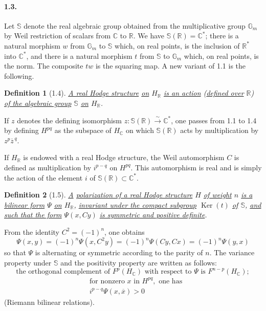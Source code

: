 \documentclass[10pt,leqno]{article}
\newcommand{\C}{\mathbb C}
\newcommand{\R}{\mathbb R}
\newcommand{\Gm}{\mathbb G_m}
\newcommand{\bS}{\mathbb S}
\newcommand{\Ker}{\operatorname{Ker}}
\theoremstyle{deligne}
\newtheorem*{definition}{Definition}
\renewcommand{\underline}[1]{\uline{#1}}
\begin{document}
\paragraph{1.3.}
Let $\bS$ denote the real algebraic group obtained from the multiplicative group $\Gm$ by Weil restriction of scalars from $\C$ to $\R$. We have $\bS(\R)=\C^*$; there is a natural morphism $w$ from $\Gm$ to $\bS$ which, on real points, is the inclusion of $\R^*$ into $\C^*$, and there is a natural morphism $t$ from $\bS$ to $\Gm$ which, on real points, is the norm. The composite $tw$ is the squaring map. A new variant of 1.1 is the following.

\begin{definition}[1.4]
\underline{A real Hodge structure} \underline{on} $H_\R$ \underline{is an action} (\underline{defined over} $\R$) \underline{of the algebraic group} $\bS$ \underline{on} $H_\R$.
\end{definition}

If $z$ denotes the defining isomorphism $z:\bS(\R)\xrightarrow{\sim}\C^*$, one passes from 1.1 to 1.4 by defining $H^{pq}$ as the subspace of $H_\C$ on which $\bS(\R)$ acts by multiplication by $z^p\overline z^{\,q}$.

If $H_\R$ is endowed with a real Hodge structure, the Weil automorphism $C$ is defined as multiplication by $i^{p-q}$ on $H^{pq}$. This automorphism is real and is simply the action of the element $i$ of $\bS(\R)\subset\C^*$.

\begin{definition}[1.5]
\underline{A} \underline{polarization of a real Hodge structure} $H$ \underline{of weight} $n$ \underline{is a bilinear form} $\Psi$ \underline{on} $H_\R$, \underline{invariant under the compact subgroup} $\Ker(t)$ \underline{of} $\bS$, \underline{and such that the form} $\Psi(x,Cy)$ \underline{is symmetric and positive definite}.
\end{definition}

From the identity $C^2=(-1)^n$, one obtains
\[
\Psi(x,y)=(-1)^n\Psi(x,C^2y)=(-1)^n\Psi(Cy,Cx)=(-1)^n\Psi(y,x)
\]
so that $\Psi$ is alternating or symmetric according to the parity of $n$. The variance property under $\bS$ and the positivity property are written as follows:
\begin{equation}
\text{the orthogonal complement of }F^p(H_\C)\text{ with respect to }\Psi\text{ is }F^{n-p}(H_\C);\tag{1.5.1}
\end{equation}
\begin{equation}
\begin{aligned}
&\text{for nonzero }x\text{ in }H^{pq},\text{ one has}\\
&i^{p-q}\Psi(x,\overline x)>0
\end{aligned}
\tag{1.5.2}
\end{equation}
(Riemann bilinear relations).
\end{document}
